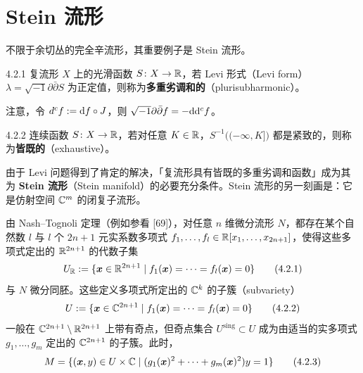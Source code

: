

\section{Stein 流形}

不限于余切丛的完全辛流形，其重要例子是 Stein 流形。

\begin{definition}{4.2.1}
复流形 $X$ 上的光滑函数 $S\colon X\to\mathbb{R}$，若 Levi 形式（Levi form）$\lambda = \sqrt{-1}\partial\bar\partial S$ 为正定值，则称为\textbf{多重劣调和的}（plurisubharmonic）。
\end{definition}

注意，令 $d^cf := \mathrm{d} f\circ J$，则 $\sqrt{-1}\partial\bar\partial f = -\mathrm{d}\mathrm{d}^cf$。

\begin{definition}{4.2.2}
连续函数 $S\colon X\to\mathbb{R}$，若对任意 $K\in\mathbb{R}$，$S^{-1}\bigl((-\infty,K]\bigr)$ 都是紧致的，则称为\textbf{皆既的}（exhaustive）。
\end{definition}

由于 Levi 问题得到了肯定的解决，「复流形具有皆既的多重劣调和函数」成为其为 \textbf{Stein 流形}（Stein manifold）的必要充分条件。Stein 流形的另一刻画是：它是仿射空间 $\mathbb{C}^m$ 的闭复子流形。

由 Nash--Tognoli 定理（例如参看 [69]），对任意 $n$ 维微分流形 $N$，都存在某个自然数 $l$ 与 $l$ 个 $2n+1$ 元实系数多项式 $f_1,\dots,f_l\in\mathbb{R}[x_1,\dots,x_{2n+1}]$，使得这些多项式定出的 $\mathbb{R}^{2n+1}$ 的代数子集
\begin{equation}
  U_{\mathbb{R}} := \{\bm{x}\in\mathbb{R}^{2n+1}\mid f_1(\bm{x}) = \dots = f_l(\bm{x}) = 0\}
  \tag{4.2.1}
\end{equation}
与 $N$ 微分同胚。这些定义多项式所定出的 $\mathbb{C}^k$ 的子簇（subvariety）
\begin{equation}
  U := \{\bm{x}\in\mathbb{C}^{2n+1}\mid f_1(\bm{x}) = \dots = f_l(\bm{x}) = 0\}
  \tag{4.2.2}
\end{equation}
一般在 $\mathbb{C}^{2n+1}\setminus\mathbb{R}^{2n+1}$ 上带有奇点，但奇点集合 $U^{\mathrm{sing}}\subset U$ 成为由适当的实多项式 $g_1,\dots,g_m$ 定出的 $\mathbb{C}^{2n+1}$ 的子簇。此时，
\begin{equation}
  M = \{(\bm{x},y)\in U\times\mathbb{C}\mid (g_1(\bm{x})^2+\dots+g_m(\bm{x})^2)y = 1\}
  \tag{4.2.3}
\end{equation}

